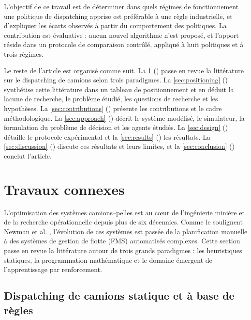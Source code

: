 \documentclass[11pt,a4paper]{article}
\newif\ifrevmarks
\newcommand{\revtag}[1]{\ifrevmarks\textsuperscript{\textcolor{red!70!black}{\scriptsize[#1]}}\fi}
\newcommand{\rev}[2]{\ifrevmarks{\color{revcolor}#2}\revtag{#1}\else#2\fi}
\newenvironment{revbloc}[1]{\par\ifrevmarks\color{revcolor}\noindent\revtag{#1}\ \fi}{\par}
\newcommand{\adir}[1]{\ifrevmarks\textcolor{violet}{\textbf{[À VALIDER AVEC LA DIRECTRICE : #1]}}\fi}
\begin{document}
\begin{revbloc}{M23, M24}
L'objectif de ce travail est de déterminer dans quels régimes de fonctionnement une politique de dispatching apprise est préférable à une règle industrielle, et d'expliquer les écarts observés à partir du comportement des politiques. La contribution est évaluative : aucun nouvel algorithme n'est proposé, et l'apport réside dans un protocole de comparaison contrôlé, appliqué à huit politiques et à trois régimes.

Le reste de l'article est organisé comme suit. La \cref{sec:relwork} () passe en revue la littérature sur le dispatching de camions selon trois paradigmes. La \cref{sec:positioning} () synthétise cette littérature dans un tableau de positionnement et en déduit la lacune de recherche, le problème étudié, les questions de recherche et les hypothèses. La \cref{sec:contributions} () présente les contributions et le cadre méthodologique. La \cref{sec:approach} () décrit le système modélisé, le simulateur, la formulation du problème de décision et les agents étudiés. La \cref{sec:design} () détaille le protocole expérimental et la \cref{sec:results} () les résultats. La \cref{sec:discussion} () discute ces résultats et leurs limites, et la \cref{sec:conclusion} () conclut l'article.
\end{revbloc}

\adir{nouvelle structure de l'article (M24) : à faire valider avant la traduction anglaise.}


\section{Travaux connexes}
\label{sec:relwork}

L'optimisation des systèmes camions--pelles est au c\oe ur de l'ingénierie minière et de la recherche opérationnelle depuis plus de six décennies. \rev{m22}{Comme le soulignent Newman et al.} \cite{AlexandraNewman2010}, l'évolution de ces systèmes est passée de la planification manuelle à des systèmes de gestion de flotte (FMS) automatisés complexes. Cette section passe en revue la littérature autour de trois grands paradigmes : les heuristiques statiques, la programmation mathématique et le domaine émergent de l'apprentissage par renforcement.

\subsection{Dispatching de camions statique et à base de règles}
\end{document}
